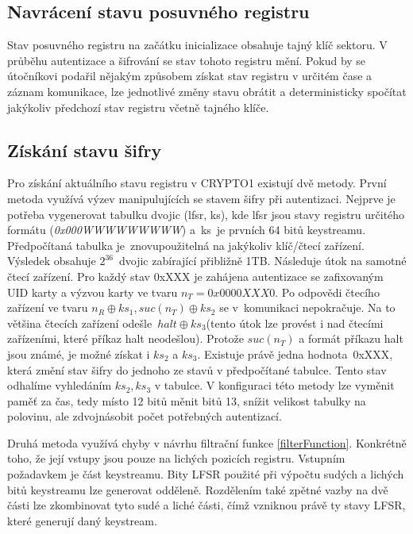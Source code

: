 \subsection{Navrácení stavu posuvného registru}
Stav posuvného registru na začátku inicializace obsahuje tajný klíč sektoru. V průběhu autentizace a šifrování se stav tohoto registru mění. Pokud by se útočníkovi podařil nějakým způsobem získat stav registru v určitém čase a záznam komunikace, lze jednotlivé změny stavu obrátit a deterministicky spočítat jakýkoliv předchozí stav registru včetně tajného klíče.\cite{Dismantling_Mifare_Classic} 

\subsection{Získání stavu šifry}
Pro získání aktuálního stavu registru v CRYPTO1 existují dvě metody. První metoda využívá výzev manipulujících se stavem šifry při autentizaci. Nejprve je potřeba vygenerovat tabulku dvojic (lfsr, ks), kde lfsr jsou stavy registru určitého formátu (\emph{0x000WWWWWWWWW}) a~ks~je prvních 64 bitů keystreamu. Předpočítaná tabulka je~znovupoužitelná na jakýkoliv klíč/čtecí zařízení. Výsledek obsahuje $2^{36}$~dvojic zabírající přibližně 1TB. Následuje útok na samotné čtecí zařízení. Pro každý stav 0xXXX je zahájena autentizace se zafixovaným UID karty a výzvou karty ve tvaru $n_T = 0x0000XXX0$. Po odpovědi čtecího zařízení ve tvaru $n_R \oplus ks_1,suc(n_T) \oplus ks_2$ se v~komunikaci nepokračuje. Na to většina čtecích zařízení odešle~$halt \oplus ks_3$(tento útok lze provést i nad čtecími zařízeními, které příkaz halt neodešlou). Protože $suc(n_T)$ a formát příkazu halt jsou známé, je možné získat i $ks_2$ a $ks_3$. Existuje právě jedna hodnota~0xXXX, která změní stav šifry do jednoho ze stavů v předpočítané tabulce. Tento stav odhalíme vyhledáním $ks_2,ks_3$ v tabulce. V konfiguraci této metody lze vyměnit paměť za čas, tedy místo 12 bitů měnit bitů 13, snížit velikost tabulky na polovinu, ale zdvojnásobit počet potřebných autentizací.\cite{Dismantling_Mifare_Classic}
\par
Druhá metoda využívá chyby v návrhu filtrační funkce \ref{filterFunction}. Konkrétně toho, že její vstupy jsou pouze na lichých pozicích registru. Vstupním požadavkem je část keystreamu. Bity LFSR použité při výpočtu sudých a lichých bitů keystreamu lze generovat odděleně. Rozdělením také zpětné vazby na dvě části lze zkombinovat tyto sudé a liché části, čímž vzniknou právě ty stavy LFSR, které generují daný keystream.\cite{Dismantling_Mifare_Classic}


